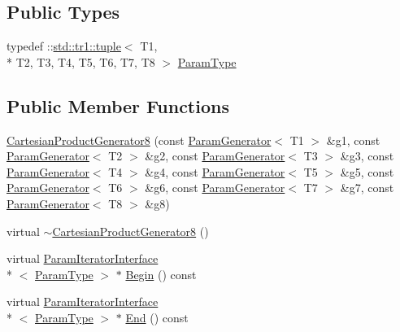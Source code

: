 \subsection*{Public Types}
\begin{DoxyCompactItemize}
\item 
typedef \-::\hyperlink{classstd_1_1tr1_1_1tuple}{std\-::tr1\-::tuple}$<$ T1, \\*
T2, T3, T4, T5, T6, T7, T8 $>$ \hyperlink{classtesting_1_1internal_1_1CartesianProductGenerator8_ac0ce78b904e9a155d0f0711b9012ec0b}{Param\-Type}
\end{DoxyCompactItemize}
\subsection*{Public Member Functions}
\begin{DoxyCompactItemize}
\item 
\hyperlink{classtesting_1_1internal_1_1CartesianProductGenerator8_a07f33a7263f933d4fbabdb9e930d7f86}{Cartesian\-Product\-Generator8} (const \hyperlink{classtesting_1_1internal_1_1ParamGenerator}{Param\-Generator}$<$ T1 $>$ \&g1, const \hyperlink{classtesting_1_1internal_1_1ParamGenerator}{Param\-Generator}$<$ T2 $>$ \&g2, const \hyperlink{classtesting_1_1internal_1_1ParamGenerator}{Param\-Generator}$<$ T3 $>$ \&g3, const \hyperlink{classtesting_1_1internal_1_1ParamGenerator}{Param\-Generator}$<$ T4 $>$ \&g4, const \hyperlink{classtesting_1_1internal_1_1ParamGenerator}{Param\-Generator}$<$ T5 $>$ \&g5, const \hyperlink{classtesting_1_1internal_1_1ParamGenerator}{Param\-Generator}$<$ T6 $>$ \&g6, const \hyperlink{classtesting_1_1internal_1_1ParamGenerator}{Param\-Generator}$<$ T7 $>$ \&g7, const \hyperlink{classtesting_1_1internal_1_1ParamGenerator}{Param\-Generator}$<$ T8 $>$ \&g8)
\item 
virtual \hyperlink{classtesting_1_1internal_1_1CartesianProductGenerator8_a1b5959a462274695cdee2c37185b291f}{$\sim$\-Cartesian\-Product\-Generator8} ()
\item 
virtual \hyperlink{classtesting_1_1internal_1_1ParamIteratorInterface}{Param\-Iterator\-Interface}\\*
$<$ \hyperlink{classtesting_1_1internal_1_1CartesianProductGenerator8_ac0ce78b904e9a155d0f0711b9012ec0b}{Param\-Type} $>$ $\ast$ \hyperlink{classtesting_1_1internal_1_1CartesianProductGenerator8_a024b3406f95ada161eee58e7df008cf4}{Begin} () const 
\item 
virtual \hyperlink{classtesting_1_1internal_1_1ParamIteratorInterface}{Param\-Iterator\-Interface}\\*
$<$ \hyperlink{classtesting_1_1internal_1_1CartesianProductGenerator8_ac0ce78b904e9a155d0f0711b9012ec0b}{Param\-Type} $>$ $\ast$ \hyperlink{classtesting_1_1internal_1_1CartesianProductGenerator8_a2a6e4ba6ad072f85c1193e1d17983f5f}{End} () const 
\end{DoxyCompactItemize}


